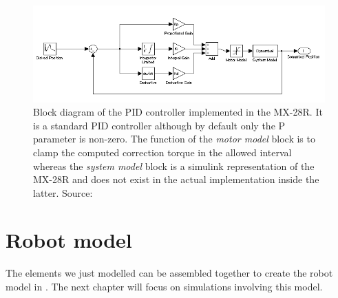 \begin{figure}[htp]
\centering
    \includegraphics[width = \textwidth]{figures/pidcontrol}
    \caption[MX-28 PID controller]{Block diagram of the PID controller implemented in the MX-28R. It is a standard PID controller although by default only the P parameter is non-zero. The function of the \textit{motor model} block is to clamp the computed correction torque in the allowed interval whereas the \emph{system model} block is a simulink representation of the MX-28R and does not exist in the actual implementation inside the latter. Source: \cite{mx_28_manual}}
    \label{fig:mx28_pid}
\end{figure}

\clearpage
\section{Robot model}
The elements we just modelled can be assembled together to create the robot model in . The next chapter will focus on simulations involving this model.
 
